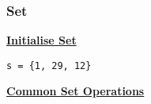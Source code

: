 \subsubsection{Set}
{\centering\underline{\textbf{Initialise Set}} \par}
\begin{lstlisting}
s = {1, 29, 12}
\end{lstlisting}

{\centering\underline{\textbf{Common Set Operations}} \par}
